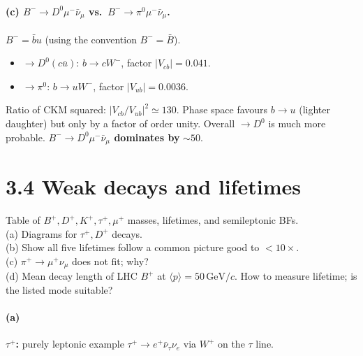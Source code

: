 \documentclass[11pt]{article}
\newcommand{\Q}[1]{\begin{question}#1\end{question}}
\newcommand{\GeV}{\,\mathrm{GeV}}
\newcommand{\fphoton}[2]{\draw[decorate, decoration={snake, amplitude=0.6mm, segment length=2mm}] (#1) -- (#2);}
\begin{document}
\paragraph{(c) $B^-\to D^0\mu^-\bar\nu_\mu$ vs.\ $B^-\to\pi^0\mu^-\bar\nu_\mu$.} $B^-=\bar b u$ (using the convention $B^-=\bar B$).
\begin{itemize}[itemsep=1pt]
\item $\to D^0(c\bar u)$: $b\to c W^-$, factor $|V_{cb}|=0.041$.
\item $\to\pi^0$: $b\to u W^-$, factor $|V_{ub}|=0.0036$.
\end{itemize}
Ratio of CKM squared: $|V_{cb}/V_{ub}|^{2}\simeq 130$. Phase space favours $b\to u$ (lighter daughter) but only by a factor of order unity. Overall $\to D^0$ is much more probable. \textbf{$B^-\to D^0\mu^-\bar\nu_\mu$ dominates by} $\sim 50$.

\section*{3.4 \quad Weak decays and lifetimes}

\Q{Table of $B^+,D^+,K^+,\tau^+,\mu^+$ masses, lifetimes, and semileptonic BFs.\\
(a) Diagrams for $\tau^+,D^+$ decays.\\
(b) Show all five lifetimes follow a common picture good to $<10\times$.\\
(c) $\pi^+\to\mu^+\nu_\mu$ does not fit; why?\\
(d) Mean decay length of LHC $B^+$ at $\langle p\rangle=50\GeV/c$. How to measure lifetime; is the listed mode suitable?}

\paragraph{(a)}
\textbf{$\tau^+$:} purely leptonic example $\tau^+\to e^+\bar\nu_\tau\nu_e$ via $W^+$ on the $\tau$ line.
\begin{center}
\end{center}
\end{document}
